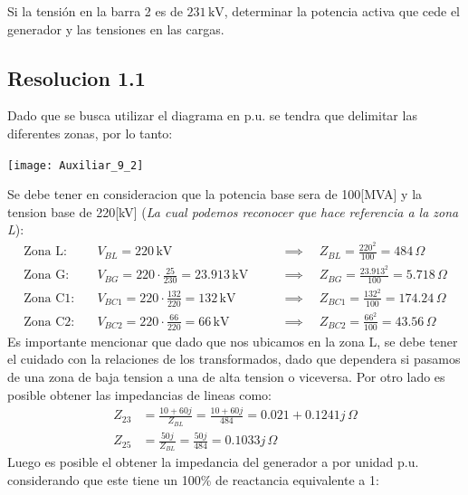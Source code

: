 \documentclass[
  11pt,
  letterpaper,
   addpoints,
   answers
  ]{exam}
\begin{document}
\begin{questions}
    Si la tensión en la barra 2 es de \(231 \, \text{kV}\), determinar la potencia activa que cede el generador y las tensiones en las cargas.
    
    
    
    \begin{solution}
        \subsection*{Resolucion 1.1}
        Dado que se busca utilizar el diagrama en p.u. se tendra que delimitar las diferentes zonas, por lo tanto:
        \begin{center}
            \texttt{[image: Auxiliar\_9\_2]}
        \end{center}
        Se debe tener en consideracion que la potencia base sera de 100[MVA] y la tension base de 220[kV] (\textit{La cual podemos reconocer que hace referencia a la zona L}):
        \begin{align*}
            \text{Zona L:}  & \quad V_{BL} = 220 \, \text{kV} \quad && \implies \quad Z_{BL} = \frac{220^2}{100} = 484 \, \Omega \\[10pt]
            \text{Zona G:}  & \quad V_{BG} = 220 \cdot \frac{25}{230} = 23.913 \, \text{kV} \quad && \implies \quad Z_{BG} = \frac{23.913^2}{100} = 5.718 \, \Omega \\[10pt]
            \text{Zona C1:} & \quad V_{BC1} = 220 \cdot \frac{132}{220} = 132 \, \text{kV} \quad && \implies \quad Z_{BC1} = \frac{132^2}{100} = 174.24 \, \Omega \\[10pt]
            \text{Zona C2:} & \quad V_{BC2} = 220 \cdot \frac{66}{220} = 66 \, \text{kV} \quad && \implies \quad Z_{BC2} = \frac{66^2}{100} = 43.56 \, \Omega
            \end{align*}
        Es importante mencionar que dado que nos ubicamos en la zona L, se debe tener el cuidado con la relaciones de los transformados, dado que dependera si pasamos de una zona de baja tension a una de alta tension o viceversa. Por otro lado es posible obtener las impedancias de lineas como:
        \begin{align}
            Z_{23} &= \frac{10+60j}{Z_{BL}} = \frac{10+60j}{484} = 0.021 + 0.1241j \, \Omega \\
            Z_{25} &= \frac{50j}{Z_{BL}} = \frac{50j}{484} = 0.1033j \, \Omega
        \end{align}
        Luego es posible el obtener la impedancia del generador a por unidad p.u. considerando que este tiene un 100\% de reactancia equivalente a 1:

\end{solution}
\end{questions}
\end{document}
